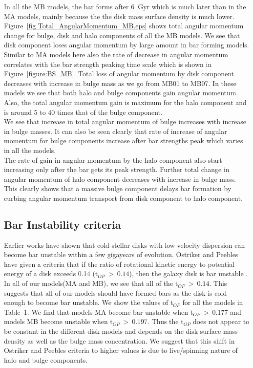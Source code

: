 \documentclass[a4paper,fleqn,usenatbib,useAMS]{mnras}
\begin{document}
  In all the MB models, the bar forms after 6~Gyr which is much later than in the MA models, mainly because the the disk mass surface density is much lower. Figure~\ref{fig Total_AngularMomentum_MB.eps} shows total angular momentum change for bulge, disk and halo components of all the MB models. We see that disk component loses angular momentum by large amount in bar forming models. Similar to MA models here also the rate of decrease in angular momentum correlates with the bar strength peaking time scale which is shown in  Figure~\ref{figure:BS_MB}. Total loss of angular momentum by disk component decreases with increase in bulge mass as we go from MB01 to MB07. In these models we see that both halo and bulge components gain angular momentum. Also, the total angular momentum gain is maximum for the halo component and is around 5 to 40 times that of the bulge component.
   \\
\indent We see that increase in total angular momentum of bulge increases with increase in bulge masses. It can also be seen clearly that rate of increase of angular momentum for bulge components increase after bar strengths peak which varies in all the models. \\
\indent The rate of gain in angular momentum by the halo component also start increasing only after the bar gets its peak strength. Further total change in angular momentum of halo component decreases with increase in bulge mass. This clearly shows that a massive bulge component delays bar formation by curbing angular momentum transport from disk component to halo component. 


\subsection{Bar Instability criteria} \label{criteria}
Earlier works have shown that cold stellar disks \citep{12a,12b,15a1} with low velocity dispersion can become bar unstable within a few gigayears of evolution. Ostriker and Peebles have given a criteria that if the ratio of rotational kinetic energy to potential energy of a disk exceeds 0.14 (t$_{OP}~>~0.14$), then the galaxy disk is bar unstable \citep{24}. In all of our models(MA and MB), we see that all of the t$_{OP}~>~0.14$. This suggests that all of our models should have formed bars as the disk is cold enough to become bar unstable. We show the values of t$_{OP}$ for all the models in Table~1. We find that models MA become bar unstable when t$_{OP}~>~0.177$ and models MB become unstable when t$_{OP}~>~0.197$. Thus the t$_{OP}$ does not appear to be constant in the different disk models and depends on the disk surface mass density as well as the bulge mass concentration. We suggest that this shift in Ostriker and Peebles criteria to higher values is due to live/spinning nature of halo \citep{17} and bulge components.
\end{document}
